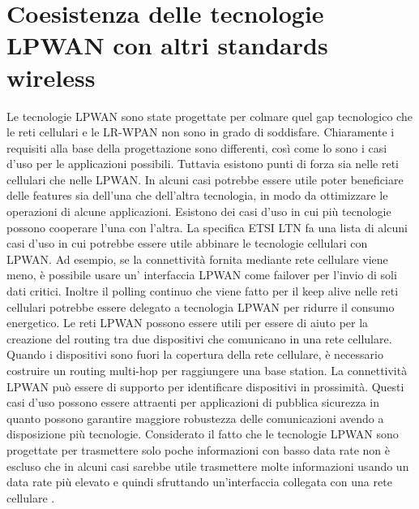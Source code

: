 \documentclass[12pt,a4paper,openright,twoside]{report}
\begin{document}
\section{Coesistenza delle tecnologie LPWAN con altri standards wireless}
Le tecnologie LPWAN sono state progettate per colmare quel gap tecnologico che le reti cellulari e le LR-WPAN non sono in grado di soddisfare. Chiaramente i requisiti alla base della progettazione sono differenti, cos\`i come lo sono i casi d'uso per le applicazioni possibili. 
Tuttavia esistono punti di forza sia nelle reti cellulari che nelle LPWAN. 
In alcuni casi potrebbe essere utile poter beneficiare delle features sia dell'una che dell'altra tecnologia, in modo da ottimizzare le operazioni di alcune applicazioni.					
Esistono dei casi d'uso in cui pi\`u tecnologie possono cooperare l'una con l'altra. 
La specifica ETSI LTN fa una lista di alcuni casi d'uso in cui potrebbe essere utile abbinare le tecnologie cellulari con LPWAN. 
Ad esempio, se la connettivit\`a fornita mediante rete cellulare viene meno, \`e possibile usare un' interfaccia LPWAN come failover per l'invio di soli dati critici. Inoltre il polling continuo che viene fatto per il keep alive nelle reti cellulari potrebbe essere delegato a tecnologia LPWAN per ridurre il consumo energetico.   
Le reti LPWAN possono essere utili per essere di aiuto per la creazione del routing tra due dispositivi che comunicano in una rete cellulare.		
Quando i dispositivi sono fuori la copertura della rete cellulare, \`e necessario costruire un routing multi-hop per raggiungere una base station. La connettivit\`a LPWAN pu\`o essere di supporto per identificare dispositivi in prossimit\`a. Questi casi d'uso possono essere attraenti per applicazioni di pubblica sicurezza in quanto possono garantire maggiore robustezza delle comunicazioni avendo a disposizione pi\`u tecnologie. 
Considerato il fatto che le tecnologie LPWAN sono progettate per trasmettere solo poche informazioni con basso data rate non \`e escluso che in alcuni casi sarebbe utile trasmettere molte informazioni usando un data rate pi\`u elevato e quindi sfruttando un'interfaccia collegata con una rete cellulare \cite{K2}. 
\end{document}
